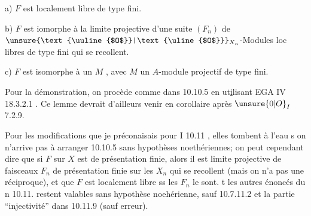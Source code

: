 a) $F$ est localement libre de type fini.

b) $F$ est iomorphe à la limite projective d'une suite $(F_n)$ de $\unsure{\text{\uuline{$O$}}|\text{\uline{$O$}}}_{X_n}$-Modules loc libres de type fini qui se recollent.

c) $F$ est isomorphe à un $M$ , avec $M$ un $A$-module projectif de type fini.

Pour la démonstration, on procède comme dans 10.10.5 en ut\uline{i}lisant EGA IV 18.3.2.1 . Ce lemme devrait d'ailleurs venir en corollaire  après $\unsure{0|O}_I$ 7.2.9.

Pour les modifications que je préconaisais pour I 10.11 , elles tombent à l'eau s on n'arrive pas à arranger 10.10.5 sans hypothèses noethériennes; on peut cependant dire que si $F$ sur $X$ est de présentation finie, alors il est limite projective de faisceaux $F_n$ de présentation finie sur les $X_n$ qui se recollent (mais on n'a pas une réciproque), et que $F$ est localement libre ss les $F_n$ le sont. t  les autres énoncés du n 10.11. restent valables sans hypothèse noehérienne, sauf 10.7.11.2 et la partie ``injectivité'' dans 10.11.9 (sauf erreur).
